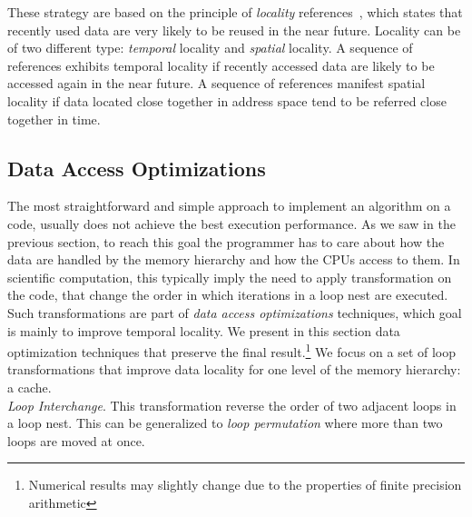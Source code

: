 These strategy are based on the principle of \textit{locality} references~\cite{Hennessy-Patterson}, which states that recently used data are very likely to be reused in the near future. Locality can be of two different type: \textit{temporal} locality and \textit{spatial} locality. A sequence of references exhibits temporal locality if recently accessed data are likely to be accessed again in the near future. A sequence of references manifest spatial locality if data located close together in address space tend to be referred close together in time.

\subsection{Data Access Optimizations}
The most straightforward and simple approach to implement an algorithm on a code, usually does not achieve the best execution performance. As we saw in the previous section, to reach this goal the programmer has to care about how the data are handled by the memory hierarchy and how the CPUs access to them. In scientific computation, this typically imply the need to apply transformation on the code, that change the order in which iterations in a loop nest are executed. Such transformations are part of \textit{data access optimizations} techniques, which goal is mainly to improve temporal locality. We present in this section data optimization techniques that preserve the final result.\footnote{Numerical results may slightly change due to the properties of finite precision arithmetic} We focus on a set of loop transformations that improve data locality for one level of the memory hierarchy: a cache.
\\

\noindent \textit{Loop Interchange}. This transformation reverse the order of two adjacent loops in a loop nest. This can be generalized to \textit{loop permutation} where more than two loops are moved at once.  %

